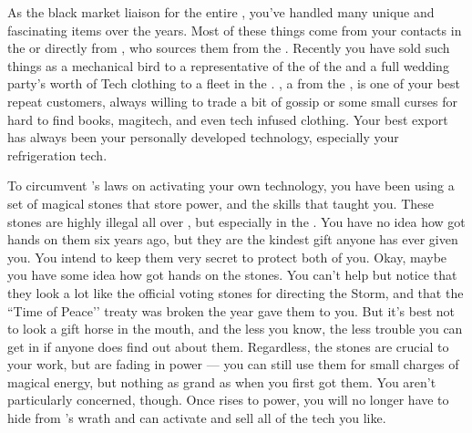 \documentclass[char]{GL2020}
\begin{document}
As the black market liaison for the entire \pTech{}, you've handled many unique and fascinating items over the years. Most of these things come from your contacts in the \pTech{} or directly from \cChupSecond{}, who sources them from the \pShip{}. Recently you have sold such things as a mechanical bird to a representative of the \cQueen{\Monarch} of the \pFarm{} and a full wedding party's worth of Tech clothing to a fleet in the \pShip{}. \cHedonist{\full}, a \cHedonist{\cleric} from the \pFarm{}, is one of your best repeat customers, always willing to trade a bit of gossip or some small curses for hard to find books, magitech, and even tech infused clothing. Your best export has always been your personally developed technology, especially your refrigeration tech.

To circumvent \cTechGod{}'s laws on activating your own technology, you have been using a set of magical stones that store power, and the skills that \cGenesis{} taught you. These stones are highly illegal all over \pEarth{}, but especially in the \pTech{}. You have no idea how \cHeadScientist{} got \cHeadScientist{\their} hands on them six years ago, but they are the kindest gift anyone has ever given you. You intend to keep them very secret to protect both of you. Okay, maybe you have some idea how \cHeadScientist{} got \cHeadScientist{\their} hands on the stones. You can't help but notice that they look a lot like the official voting stones for directing the Storm, and that the ``Time of Peace’’ treaty was broken the year \cHeadScientist{} gave them to you. But it's best not to look a gift horse in the mouth, and the less you know, the less trouble you can get in if anyone does find out about them. Regardless, the stones are crucial to your work, but are fading in power — you can still use them for small charges of magical energy, but nothing as grand as when you first got them. You aren't particularly concerned, though. Once \cGenesis{} rises to power, you will no longer have to hide from \cTechGod{}'s wrath and can activate and sell all of the tech you like.
\end{document}
